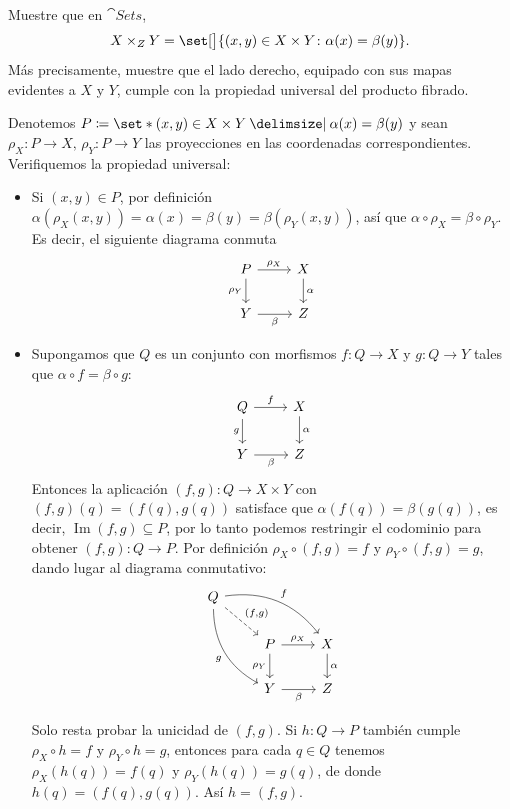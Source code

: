 \setcounter{neje}{13}
\begin{nejer}
Muestre que en $\cat{Sets}$,
$$
X \times_Z Y = \set[\big]{ (x, y) \in X \times Y \colon \alpha(x) = \beta(y) }.
$$
Más precisamente, muestre que el lado derecho, equipado con sus mapas evidentes a $X$ y $Y$, cumple con la propiedad universal del producto fibrado.
\end{nejer}
\begin{sol}
Denotemos $P\coloneq \set*{ (x, y) \in X \times Y \given \alpha(x) = \beta(y) }$ y sean $\rho_X \colon P \to X,\,\rho_Y \colon P \to Y$ las proyecciones en las coordenadas correspondientes. Verifiquemos la propiedad universal:
\begin{itemize}
\item Si $(x,y) \in P$, por definición $\alpha(\rho_X(x,y)) = \alpha(x) = \beta(y) = \beta(\rho_Y(x,y))$, así que $\alpha \circ \rho_X = \beta \circ\rho_Y$. Es decir, el siguiente diagrama conmuta
\[\begin{tikzcd}[ampersand replacement=\&]
	P \ar[r, "\rho_X"] \ar[d, "\rho_Y"'] \& X \ar[d, "\alpha"] \\
	Y \ar[r, "\beta"'] \& Z
\end{tikzcd}\]

\item Supongamos que $Q$ es un conjunto con morfismos $f\colon Q \to X$ y $g\colon Q\to Y$ tales que $\alpha\circ f = \beta\circ g$:
\[\begin{tikzcd}[ampersand replacement=\&]
	Q \ar[r, "f"] \ar[d, "g"'] \& X \ar[d, "\alpha"] \\
	Y \ar[r, "\beta"'] \& Z
\end{tikzcd}\]
Entonces la aplicación $(f,g) \colon Q \to X \times Y$ con $(f,g)(q) = (f(q),g(q))$ satisface que $\alpha(f(q)) = \beta(g(q))$, es decir, $\operatorname{Im}(f,g) \subseteq P$, por lo tanto podemos restringir el codominio para obtener $(f,g) \colon Q \to P$. Por definición $\rho_X \circ (f,g) = f$ y $\rho_Y \circ (f,g) = g$, dando lugar al diagrama conmutativo:
\[\begin{tikzcd}[ampersand replacement=\&]
	Q \ar[ddr, bend right, "g"'] \ar[drr, bend left, "f"] \ar[dr, dashed, "{(f,g)}"] \& \&\\
	\& P \ar[d, "\rho_Y"'] \ar[r, "\rho_X"] \& X \ar[d, "\alpha"] \\
	\& Y \ar[r, "\beta"'] \& Z
\end{tikzcd}\]

Solo resta probar la unicidad de $(f,g)$. Si $h \colon Q \to P$ también cumple $\rho_X \circ h = f$ y $\rho_Y \circ h = g$, entonces para cada $q\in Q$ tenemos $\rho_X(h(q)) = f(q)$ y $\rho_Y(h(q)) = g(q)$, de donde $h(q) = (f(q),g(q))$. Así $h = (f,g)$.
\end{itemize}
\end{sol}